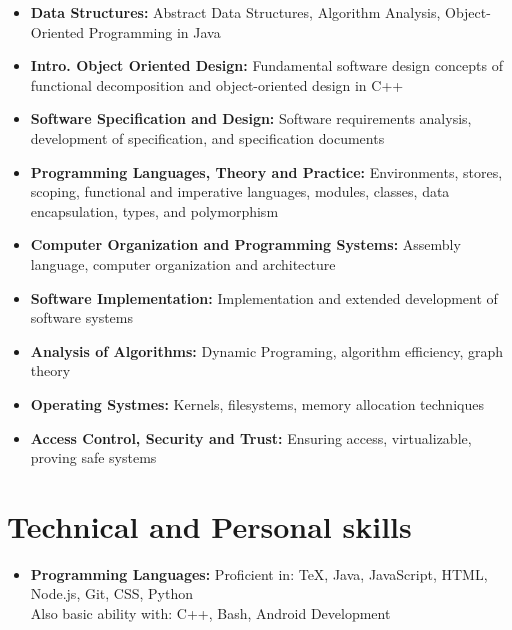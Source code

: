 \documentclass[11pt,a4paper,roman]{moderncv}        %
\begin{document}
\begin{itemize}

  \item{\textbf{Data Structures:} Abstract Data Structures, Algorithm Analysis, Object-Oriented Programming in Java}
  \item{\textbf{Intro. Object Oriented Design:} Fundamental software design concepts of functional decomposition and object-oriented design in C++}
  \item{\textbf{Software Specification and Design:} Software requirements analysis, development of specification, and specification documents}
  \item{\textbf{Programming Languages, Theory and Practice:} Environments, stores, scoping, functional and imperative languages, modules, classes, data encapsulation, types, and polymorphism}
  \item{\textbf{Computer Organization and Programming Systems:} Assembly language, computer organization and architecture}
  \item{\textbf{Software Implementation:} Implementation and extended development of software systems}
  \item{\textbf{Analysis of Algorithms:} Dynamic Programing, algorithm efficiency, graph theory}
  \item{\textbf{Operating Systmes:} Kernels, filesystems, memory allocation techniques}
  \item{\textbf{Access Control, Security and Trust:} Ensuring access, virtualizable, proving safe systems}

\end{itemize}

\vspace{2pt}

\section{Technical and Personal skills}

\vspace{2pt}

\begin{itemize}

\item \textbf{Programming Languages:} Proficient in: TeX, Java, JavaScript, HTML, Node.js, Git, CSS, Python \\ Also basic ability with: C++, Bash, Android Development

\vspace{2pt}

\end{itemize}
\end{document}
